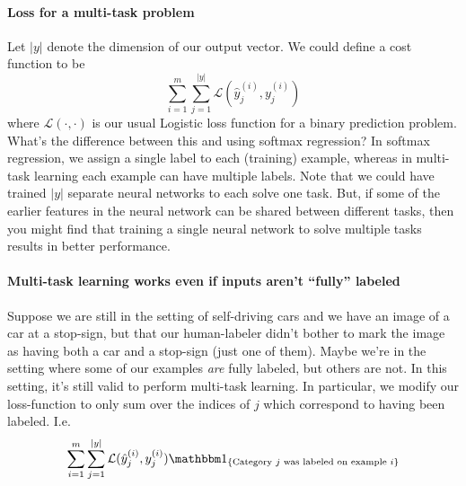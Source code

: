 \documentclass[12pt]{article}
\begin{document}
\paragraph{Loss for a multi-task problem} Let $|y|$ denote the dimension of our output vector. We could define a cost function to be
\begin{equation*}   \sum_{i=1}^m \sum_{j=1}^{|y|} \mathcal L(\hat y_j^{(i)}, y_j^{(i)}) \end{equation*}
where $\mathcal L(\cdot, \cdot)$ is our usual Logistic loss function for a binary prediction problem. What's the difference between this and using softmax regression? In softmax regression, we assign a single label to each (training) example, whereas in multi-task
learning each example can have multiple labels. Note that we could have trained $|y|$ separate neural networks to each solve one task. But, if some of the earlier features in the neural network can be shared between different tasks, then you might find that training a single neural network to solve multiple tasks results in better performance.

\paragraph{Multi-task learning works even if inputs aren't ``fully'' labeled} Suppose we are still in the setting of self-driving cars and we have an image of a car at a stop-sign, but that our human-labeler didn't bother to mark the image as having both
a car and a stop-sign (just one of them). Maybe we're in the setting where some of our examples \emph{are} fully labeled, but others
are not. In this setting, it's still valid to perform multi-task learning. In particular, we modify our loss-function to only sum over the indices of $j$ which correspond to having been labeled. I.e.
\begin{equation*}   
  \sum_{i=1}^m \sum_{j=1}^{|y|} \mathcal L(\hat y_j^{(i)}, y_j^{(i)}) \mathbbm 1_{\{\textrm{Category } j \textrm{ was labeled on example } i\}} 
\end{equation*}
\end{document}
